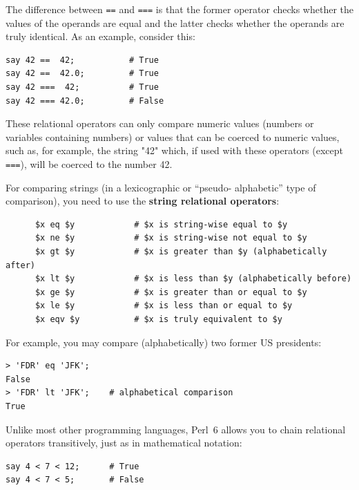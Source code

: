 The difference between {\tt ==} and {\tt ===} is that the 
former operator checks whether the values of the operands 
are equal and the latter checks whether the operands are 
truly identical. As an example, consider this:

\begin{verbatim}
say 42 ==  42;           # True
say 42 ==  42.0;         # True
say 42 ===  42;          # True
say 42 === 42.0;         # False
\end{verbatim}
%


These relational operators can only compare numeric values
(numbers or variables containing numbers) or values that 
can be coerced to numeric values, such as, for example, 
the string "42" which, if used with these operators 
(except {\tt ===}), will be coerced to the number 42.

For comparing strings (in a lexicographic or ``pseudo-
alphabetic'' type of comparison), you need to use 
the {\bf string relational operators}:

\begin{verbatim}
      $x eq $y            # $x is string-wise equal to $y
      $x ne $y            # $x is string-wise not equal to $y
      $x gt $y            # $x is greater than $y (alphabetically after)
      $x lt $y            # $x is less than $y (alphabetically before)
      $x ge $y            # $x is greater than or equal to $y
      $x le $y            # $x is less than or equal to $y
      $x eqv $y           # $x is truly equivalent to $y
\end{verbatim}
%  



For example, you may compare (alphabetically) two former 
US presidents:
\begin{verbatim}
> 'FDR' eq 'JFK';
False
> 'FDR' lt 'JFK';    # alphabetical comparison
True
\end{verbatim}
%  

Unlike most other programming languages, Perl~6 allows you to chain relational operators transitively, just as in mathematical notation:

\begin{verbatim}
say 4 < 7 < 12;      # True
say 4 < 7 < 5;       # False
\end{verbatim}

